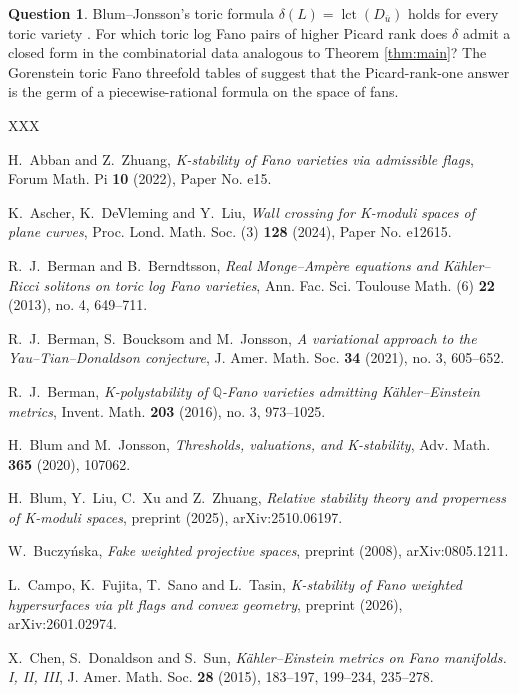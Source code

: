 \documentclass[11pt]{amsart}
\theoremstyle{definition}
\newtheorem{question}[theorem]{Question}
\theoremstyle{remark}
\DeclareMathOperator{\lct}{lct}
\newcommand{\Q}{\mathbb{Q}}
\newcommand{\bary}{\overline{u}}
\begin{document}
\begin{question}
Blum--Jonsson's toric formula \(\delta(L)=\lct(D_{\bary})\) holds for
every toric variety \cite{BJ20}. For which toric log Fano pairs of higher
Picard rank does \(\delta\) admit a closed form in the combinatorial data
analogous to Theorem \ref{thm:main}? The Gorenstein toric Fano threefold
tables of \cite{Yot23} suggest that the Picard-rank-one answer is the
germ of a piecewise-rational formula on the space of fans.
\end{question}

\begin{thebibliography}{XXX}

 H.~Abban and Z.~Zhuang,
\emph{K-stability of Fano varieties via admissible flags},
Forum Math. Pi \textbf{10} (2022), Paper No. e15.

 K.~Ascher, K.~DeVleming and Y.~Liu,
\emph{Wall crossing for K-moduli spaces of plane curves},
Proc. Lond. Math. Soc. (3) \textbf{128} (2024), Paper No. e12615.

 R.~J.~Berman and B.~Berndtsson,
\emph{Real Monge--Amp\`ere equations and K\"ahler--Ricci solitons on
toric log Fano varieties},
Ann. Fac. Sci. Toulouse Math. (6) \textbf{22} (2013), no. 4, 649--711.

 R.~J.~Berman, S.~Boucksom and M.~Jonsson,
\emph{A variational approach to the Yau--Tian--Donaldson conjecture},
J. Amer. Math. Soc. \textbf{34} (2021), no. 3, 605--652.

 R.~J.~Berman,
\emph{K-polystability of \(\Q\)-Fano varieties admitting
K\"ahler--Einstein metrics},
Invent. Math. \textbf{203} (2016), no. 3, 973--1025.

 H.~Blum and M.~Jonsson,
\emph{Thresholds, valuations, and K-stability},
Adv. Math. \textbf{365} (2020), 107062.

 H.~Blum, Y.~Liu, C.~Xu and Z.~Zhuang,
\emph{Relative stability theory and properness of K-moduli spaces},
preprint (2025), arXiv:2510.06197.

 W.~Buczy\'nska,
\emph{Fake weighted projective spaces},
preprint (2008), arXiv:0805.1211.

 L.~Campo, K.~Fujita, T.~Sano and L.~Tasin,
\emph{K-stability of Fano weighted hypersurfaces via plt flags and convex
geometry}, preprint (2026), arXiv:2601.02974.

 X.~Chen, S.~Donaldson and S.~Sun,
\emph{K\"ahler--Einstein metrics on Fano manifolds. I, II, III},
J. Amer. Math. Soc. \textbf{28} (2015), 183--197, 199--234, 235--278.


\end{thebibliography}
\end{document}

